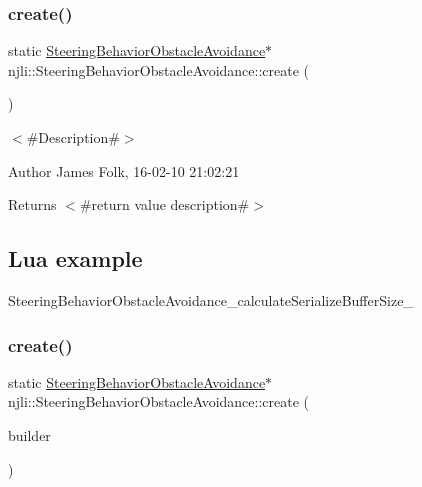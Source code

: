 \subsubsection{\texorpdfstring{create()}{create()}\hspace{0.1cm}{\footnotesize\ttfamily [1/2]}}
{\footnotesize\ttfamily static \mbox{\hyperlink{classnjli_1_1_steering_behavior_obstacle_avoidance}{Steering\+Behavior\+Obstacle\+Avoidance}}$\ast$ njli\+::\+Steering\+Behavior\+Obstacle\+Avoidance\+::create (\begin{DoxyParamCaption}{ }\end{DoxyParamCaption})\hspace{0.3cm}{\ttfamily [static]}}



$<$\#\+Description\#$>$ 

\begin{DoxyAuthor}{Author}
James Folk, 16-\/02-\/10 21\+:02\+:21
\end{DoxyAuthor}
\begin{DoxyReturn}{Returns}
$<$\#return value description\#$>$
\end{DoxyReturn}
\hypertarget{classnjli_1_1_steering_behavior_wander_ex1}{}\subsection{Lua example}\label{classnjli_1_1_steering_behavior_wander_ex1}

\begin{DoxyCodeInclude}
\end{DoxyCodeInclude}
Steering\+Behavior\+Obstacle\+Avoidance\+\_\+calculate\+Serialize\+Buffer\+Size\+\_\+ \mbox{\label{classnjli_1_1_steering_behavior_obstacle_avoidance_a6adc72d7ab3697d4da65cbd1d549b3c0}} 
\subsubsection{\texorpdfstring{create()}{create()}\hspace{0.1cm}{\footnotesize\ttfamily [2/2]}}
{\footnotesize\ttfamily static \mbox{\hyperlink{classnjli_1_1_steering_behavior_obstacle_avoidance}{Steering\+Behavior\+Obstacle\+Avoidance}}$\ast$ njli\+::\+Steering\+Behavior\+Obstacle\+Avoidance\+::create (\begin{DoxyParamCaption}\item[{const \mbox{\hyperlink{classnjli_1_1_steering_behavior_obstacle_avoidance_builder}{Steering\+Behavior\+Obstacle\+Avoidance\+Builder}} \&}]{builder }\end{DoxyParamCaption})\hspace{0.3cm}{\ttfamily [static]}}



